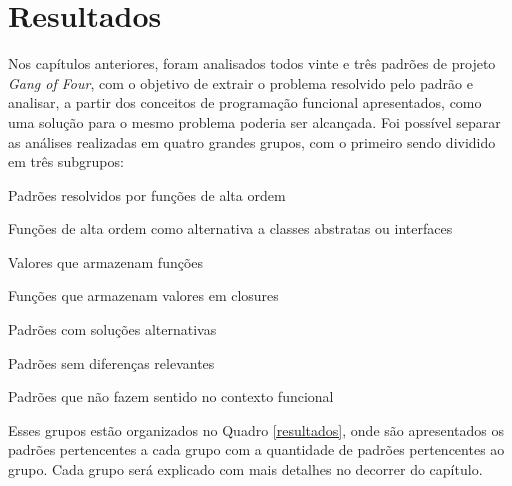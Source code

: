 \chapter{Resultados}

Nos capítulos anteriores, foram analisados todos 
vinte e três padrões de projeto \textit{Gang of 
Four}, com o objetivo de extrair o problema 
resolvido pelo padrão e analisar, a partir dos 
conceitos de programação funcional apresentados, 
como uma solução para o mesmo problema poderia ser 
alcançada. Foi possível separar as análises realizadas em 
quatro grandes grupos, com o primeiro sendo 
dividido em três subgrupos: 

\begin{alineas}
    \item Padrões resolvidos por funções de alta ordem
    \begin{alineas}
        \item Funções de alta ordem como alternativa a classes abstratas ou interfaces
        \item Valores que armazenam funções
        \item Funções que armazenam valores em closures
    \end{alineas}
    \item Padrões com soluções alternativas
    \item Padrões sem diferenças relevantes
    \item Padrões que não fazem sentido no contexto funcional
\end{alineas}

Esses grupos estão organizados no Quadro 
\ref{resultados}, onde são apresentados os 
padrões pertencentes a cada grupo com a 
quantidade de padrões pertencentes ao grupo. 
Cada grupo será explicado com mais detalhes 
no decorrer do capítulo.

